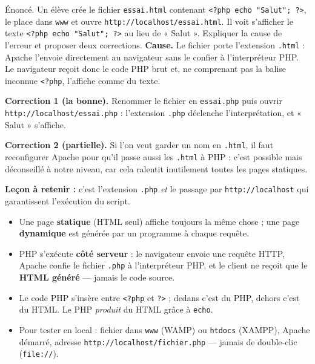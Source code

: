 \documentclass[11pt]{article}
\begin{document}
\begin{exoresolu}
Énoncé. Un élève crée le fichier \texttt{essai.html} contenant \texttt{<?php echo "Salut"; ?>}, le place dans \texttt{www} et ouvre \texttt{http://localhost/essai.html}. Il voit s'afficher le texte \texttt{<?php echo "Salut"; ?>} au lieu de « Salut ». Expliquer la cause de l'erreur et proposer deux corrections.
\tcblower
\textbf{Cause.} Le fichier porte l'extension \texttt{.html} : Apache l'envoie directement au navigateur sans le confier à l'interpréteur PHP. Le navigateur reçoit donc le code PHP brut et, ne comprenant pas la balise inconnue \texttt{<?php}, l'affiche comme du texte.\par
\textbf{Correction 1 (la bonne).} Renommer le fichier en \texttt{essai.php} puis ouvrir \texttt{http://localhost/essai.php} : l'extension \texttt{.php} déclenche l'interprétation, et « Salut » s'affiche.\par
\textbf{Correction 2 (partielle).} Si l'on veut garder un nom en \texttt{.html}, il faut reconfigurer Apache pour qu'il passe aussi les \texttt{.html} à PHP : c'est possible mais déconseillé à notre niveau, car cela ralentit inutilement toutes les pages statiques.\par
\textbf{Leçon à retenir :} c'est l'extension \texttt{.php} \emph{et} le passage par \texttt{http://localhost} qui garantissent l'exécution du script.
\end{exoresolu}

\begin{aretenir}
\begin{itemize}
\item Une page \textbf{statique} (HTML seul) affiche toujours la même chose ; une page \textbf{dynamique} est générée par un programme à chaque requête.
\item PHP s'exécute \textbf{côté serveur} : le navigateur envoie une requête HTTP, Apache confie le fichier \texttt{.php} à l'interpréteur PHP, et le client ne reçoit que le \textbf{HTML généré} — jamais le code source.
\item Le code PHP s'insère entre \texttt{<?php} et \texttt{?>} ; dedans c'est du PHP, dehors c'est du HTML. Le PHP \emph{produit} du HTML grâce à \texttt{echo}.
\item Pour tester en local : fichier dans \texttt{www} (WAMP) ou \texttt{htdocs} (XAMPP), Apache démarré, adresse \texttt{http://localhost/fichier.php} — jamais de double-clic (\texttt{file://}).
\end{itemize}
\end{aretenir}
\end{document}
